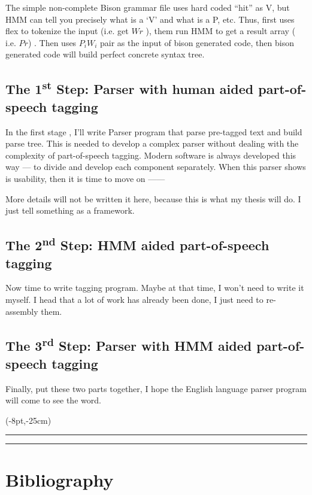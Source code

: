The simple non-complete Bison grammar file uses hard coded ``hit'' as V, but HMM can tell you  precisely what is a `V'  and what is a P, etc. Thus, first uses flex to tokenize the input (i.e. get $Wr$ ), them run HMM to get a result array ( i.e. $Pr$) . Then uses $P_{i}W_i$ pair as the
input of bison generated code, then bison generated code will build perfect concrete syntax tree.

\subsection{The 1\textsuperscript{st} Step: Parser with human aided part-of-speech tagging}

In the first stage , I'll write Parser program that parse pre-tagged text and build parse tree.
This is needed to develop a complex parser without dealing with the complexity of part-of-speech tagging. Modern software is always developed this way --- to divide  and develop each
component separately. When this parser shows is usability, then it is time to move on ------ 

More details will not be written it here, because this is what my thesis will do. I just tell something as a framework.

\subsection{The 2\textsuperscript{nd} Step: HMM aided part-of-speech tagging}

Now time to write tagging program. Maybe at that time, I won't need to write it myself.
I head that a lot of work has already been done, I just need to re-assembly them.

\subsection{The 3\textsuperscript{rd} Step: Parser with HMM aided part-of-speech tagging}

Finally, put these two parts together, I hope the English language parser program will come to see the word.

\thisfancyput(-8pt,-25cm){
\rule{.5pt}{25cm}
\hspace*{\textwidth}
\rule{.5pt}{25cm}
}

\section{Bibliography}
\nocite{GPL}


